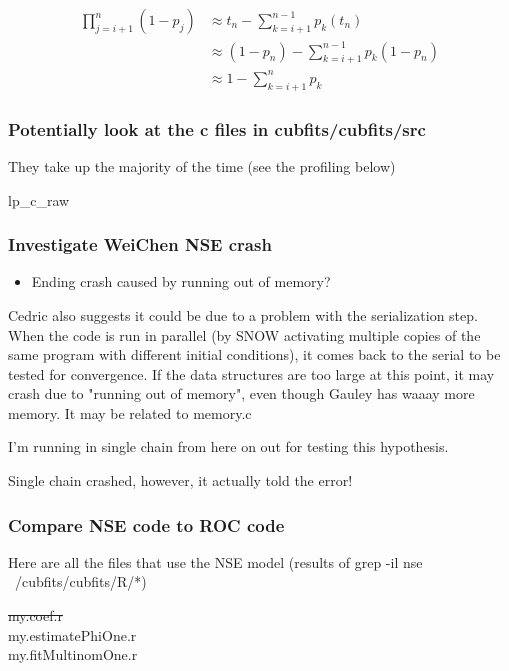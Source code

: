 \documentclass[11pt]{article} %
\begin{document}
\begin{align*}
	\prod_{j=i+1}^{n} (1-p_j) &\approx
	t_n - \sum_{k=i+1}^{n-1}p_k(t_n) \\
	&\approx (1-p_n) - \sum_{k=i+1}^{n-1}p_k(1 - p_n)\\
 	&\approx 1 -  \sum_{k=i+1}^{n}p_k
\end{align*}

\subsubsection{Potentially look at the c files in cubfits/cubfits/src}
They take up the majority of the time (see the profiling below)

lp\_c\_raw


\subsubsection{Investigate WeiChen NSE crash}
\begin{itemize}
\item Ending crash caused by running out of memory?
\end{itemize}

Cedric also suggests it could be due to a problem with the serialization step. When the code is run in parallel (by SNOW activating multiple copies of the same program with different initial conditions), it comes back to the serial to be tested for convergence. If the data structures are too large at this point, it may crash due to "running out of memory", even though Gauley has waaay more memory. It may be related to memory.c

I'm running in single chain from here on out for testing this hypothesis.

Single chain crashed, however, it actually told the error!



\subsubsection{Compare NSE code to ROC code}

Here are all the files that use the NSE model (results of grep -il nse ~/cubfits/cubfits/R/*)


\sout{my.coef.r}\\

my.estimatePhiOne.r\\
my.fitMultinomOne.r
\end{document}

